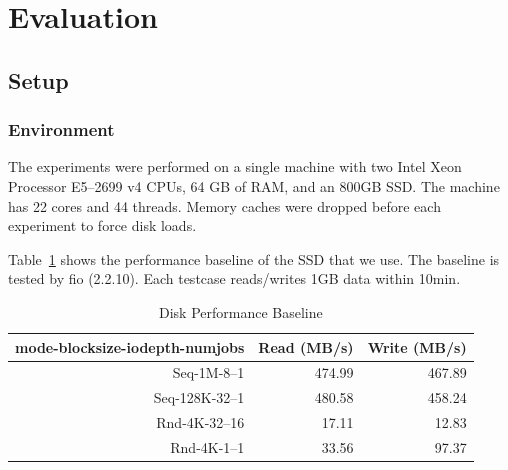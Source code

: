 \section{Evaluation}\label{sec:experiments}
\subsection{Setup}
\subsubsection{Environment}
The experiments were performed on a single machine with two Intel Xeon Processor E5--2699 v4 CPUs, 64 GB of RAM,
and an 800GB SSD\@.
The machine has 22 cores and 44 threads.
Memory caches were dropped before each experiment to force disk loads.

Table~\ref{tab:disk} shows the performance baseline of the SSD that we use.
The baseline is tested by fio (2.2.10).
Each testcase reads/writes 1GB data within 10min.
\begin{table}
  \caption{Disk Performance Baseline}\label{tab:disk}
  \begin{tabular}{rrr}
    \toprule
    mode-blocksize-iodepth-numjobs & Read (MB/s) & Write (MB/s) \\
    \midrule
    Seq-1M-8--1    & 474.99 & 467.89 \\
    Seq-128K-32--1 & 480.58 & 458.24 \\
    Rnd-4K-32--16  &  17.11 &  12.83 \\
    Rnd-4K-1--1    &  33.56 &  97.37 \\
    \bottomrule
  \end{tabular}
\end{table}

